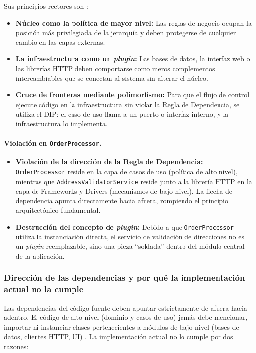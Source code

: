 Sus principios rectores son \parencite{martin2017}:

\begin{itemize}
    \item \textbf{Núcleo como la política de mayor nivel:} Las reglas de negocio ocupan la posición más privilegiada de la jerarquía y deben protegerse de cualquier cambio en las capas externas.
    \item \textbf{La infraestructura como un \emph{plugin}:} Las bases de datos, la interfaz web o las librerías HTTP deben comportarse como meros complementos intercambiables que se conectan al sistema sin alterar el núcleo.
    \item \textbf{Cruce de fronteras mediante polimorfismo:} Para que el flujo de control ejecute código en la infraestructura sin violar la Regla de Dependencia, se utiliza el DIP: el caso de uso llama a un puerto o interfaz interno, y la infraestructura lo implementa.
\end{itemize}

\paragraph{Violación en \texttt{OrderProcessor}.}
\begin{itemize}
    \item \textbf{Violación de la dirección de la Regla de Dependencia:} \texttt{OrderProcessor} reside en la capa de casos de uso (política de alto nivel), mientras que \texttt{AddressValidatorService} reside junto a la librería HTTP en la capa de Frameworks y Drivers (mecanismos de bajo nivel). La flecha de dependencia apunta directamente hacia afuera, rompiendo el principio arquitectónico fundamental.
    \item \textbf{Destrucción del concepto de \emph{plugin}:} Debido a que \texttt{OrderProcessor} utiliza la instanciación directa, el servicio de validación de direcciones no es un \emph{plugin} reemplazable, sino una pieza \enquote{soldada} dentro del módulo central de la aplicación.
\end{itemize}

\subsubsection*{Dirección de las dependencias y por qué la implementación actual no la cumple}

Las dependencias del código fuente deben apuntar estrictamente de afuera hacia adentro. El código de alto nivel (dominio y casos de uso) jamás debe mencionar, importar ni instanciar clases pertenecientes a módulos de bajo nivel (bases de datos, clientes HTTP, UI) \parencite{martin2017}. La implementación actual no lo cumple por dos razones:

